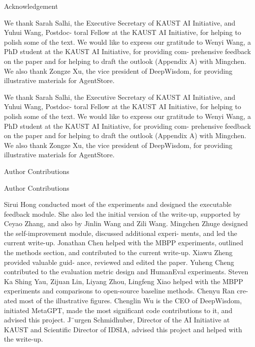 \documentclass[12pt]{article}
\begin{document}
Acknowledgement


We thank Sarah Salhi, the Executive Secretary of KAUST AI Initiative, and Yuhui Wang, Postdoc-
toral Fellow at the KAUST AI Initiative, for helping to polish some of the text. We would like to
express our gratitude to Wenyi Wang, a PhD student at the KAUST AI Initiative, for providing com-
prehensive feedback on the paper and for helping to draft the outlook (Appendix A) with Mingchen.
We also thank Zongze Xu, the vice president of DeepWisdom, for providing illustrative materials
for AgentStore.


We thank Sarah Salhi, the Executive Secretary of KAUST AI Initiative, and Yuhui Wang, Postdoc-
toral Fellow at the KAUST AI Initiative, for helping to polish some of the text. We would like to
express our gratitude to Wenyi Wang, a PhD student at the KAUST AI Initiative, for providing com-
prehensive feedback on the paper and for helping to draft the outlook (Appendix A) with Mingchen.
We also thank Zongze Xu, the vice president of DeepWisdom, for providing illustrative materials
for AgentStore.


Author Contributions


Author Contributions


Sirui Hong conducted most of the experiments and designed the executable feedback module. She
also led the initial version of the write-up, supported by Ceyao Zhang, and also by Jinlin Wang and
Zili Wang. Mingchen Zhuge designed the self-improvement module, discussed additional experi-
ments, and led the current write-up. Jonathan Chen helped with the MBPP experiments, outlined
the methods section, and contributed to the current write-up. Xiawu Zheng provided valuable guid-
ance, reviewed and edited the paper. Yuheng Cheng contributed to the evaluation metric design and
HumanEval experiments. Steven Ka Shing Yau, Zijuan Lin, Liyang Zhou, Lingfeng Xiao helped
with the MBPP experiments and comparisons to open-source baseline methods. Chenyu Ran cre-
ated most of the illustrative figures. Chenglin Wu is the CEO of DeepWisdom, initiated MetaGPT,
made the most significant code contributions to it, and advised this project. J¨urgen Schmidhuber,
Director of the AI Initiative at KAUST and Scientific Director of IDSIA, advised this project and
helped with the write-up.
\end{document}
